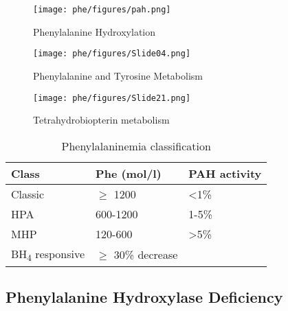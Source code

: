 \documentclass{scrartcl}
\begin{document}
\begin{figure}[htbp]
\centering
\texttt{[image: phe/figures/pah.png]}
\caption{\label{fig:orgf49191f}Phenylalanine Hydroxylation}
\end{figure}

\begin{figure}[htbp]
\centering
\texttt{[image: phe/figures/Slide04.png]}
\caption{\label{fig:org7070c04}Phenylalanine and Tyrosine Metabolism}
\end{figure}

\begin{figure}[htbp]
\centering
\texttt{[image: phe/figures/Slide21.png]}
\caption{\label{fig:org9935953}Tetrahydrobiopterin metabolism}
\end{figure}


\begin{table}[htbp]
\caption{\label{tab:org12ec922}Phenylalaninemia classification}
\centering
\begin{tabular}{lll}
Class & Phe (\textmu{}mol/l) & PAH activity\\
\hline
Classic & \(\ge\) 1200 & \textless{}1\%\\
HPA & 600-1200 & 1-5\%\\
MHP \footnotemark & 120-600 & \textgreater{}5\%\\
BH\textsubscript{4} responsive & \(\ge\) 30\% decrease & \\
\end{tabular}
\end{table}

\subsection{Phenylalanine Hydroxylase Deficiency}
\label{sec:org745978c}
\end{document}
